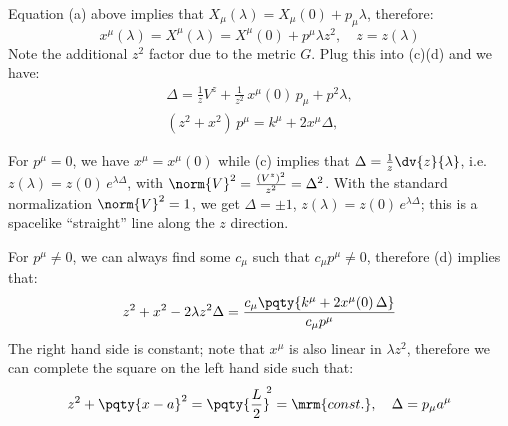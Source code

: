 \documentclass[a4paper,10pt]{article}
\begin{document}
	Equation (a) above implies that $X_\mu(\lambda) = X_\mu(0) + p_\mu \lambda$,
	therefore:
	\begin{equation}
		x^\mu(\lambda) = X^\mu(\lambda)
		= X^\mu(0) + p^\mu \lambda z^2,
	\quad z = z(\lambda)
	\end{equation}
	Note the additional $z^2$ factor due to the metric $G$. Plug this into (c)(d)
	and we have:
	\begin{equation}
	\begin{gathered}
		\Delta = \frac{1}{z} V^z
			+ \frac{1}{z^2}\, x^\mu(0)\, p_\mu
			+ p^2 \lambda,
	\\
		(z^2 + x^2)\,p^\mu
		= k^\mu + 2x^\mu \Delta,
	\end{gathered}
	\end{equation}
	
	For $p^\mu = 0$, we have $x^\mu = x^\mu(0)$ while (c) implies that $
		\Delta
		= \frac{1}{z}\dv{z}{\lambda}
	$, i.e.~$z(\lambda) = z(0) \,e^{\lambda\Delta}$, with $\norm{V}^2 = \frac{(V^z)^2}{z^2} = \Delta^2$. With the standard normalization $\norm{V}^2 = 1$, we get $\Delta = \pm 1$, $z(\lambda) = z(0) \,e^{\lambda\Delta}$; this is a spacelike ``straight'' line along the $z$ direction.
	
	For $p^\mu \ne 0$, we can always find some $c_\mu$ such that $c_\mu p^\mu \ne 0$, therefore (d) implies that:
	\begin{equation}
		z^2 + x^2 - 2\lambda z^2\Delta
		= \frac{c_\mu \pqty{k^\mu + 2x^\mu(0)\,\Delta}}{c_\mu p^\mu}
	\end{equation}
	The right hand side is constant; note that $x^\mu$ is also linear in $\lambda z^2$, therefore we can complete the square on the left hand side such that:
	\begin{equation}
		z^2 + \pqty{x - a}^2
		= \pqty{\frac{L}{2}}^{\!\!2}
		= \mrm{const.},
	\quad
		\Delta
		= p_\mu a^\mu
	\end{equation}
	
\end{document}
